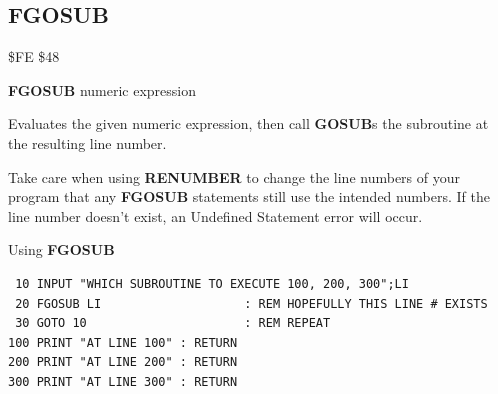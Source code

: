 \newpage
\subsection{FGOSUB}
\begin{description}[leftmargin=2cm,style=nextline]
\item [Token:]    \$FE \$48

\item [Format:]   {\bf FGOSUB} numeric expression

\item [Usage:]    Evaluates the given numeric expression, then call {\bf GOSUB}s the subroutine at the resulting line number.

\item [Remarks:]  Take care when using {\bf RENUMBER} to change the line numbers of your program that any {\bf FGOSUB} statements still use the intended numbers. If the line number doesn't exist, an Undefined Statement error will occur.

\item [Example:]  Using {\bf FGOSUB}

\begin{tcolorbox}[colback=black,coltext=white]
\verbatimfont{\codefont}
\begin{verbatim}
 10 INPUT "WHICH SUBROUTINE TO EXECUTE 100, 200, 300";LI
 20 FGOSUB LI                    : REM HOPEFULLY THIS LINE # EXISTS
 30 GOTO 10                      : REM REPEAT
100 PRINT "AT LINE 100" : RETURN
200 PRINT "AT LINE 200" : RETURN
300 PRINT "AT LINE 300" : RETURN
\end{verbatim}
\end{tcolorbox}
\end{description}


\newpage
